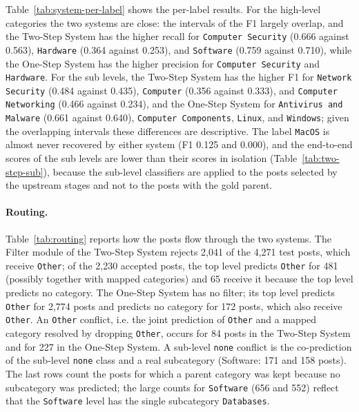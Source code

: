 Table~\ref{tab:system-per-label} shows the per-label results. For the high-level categories the two systems are close: the intervals of the F1 largely overlap, and the Two-Step System has the higher recall for \texttt{Computer Security} (0.666 against 0.563), \texttt{Hardware} (0.364 against 0.253), and \texttt{Software} (0.759 against 0.710), while the One-Step System has the higher precision for \texttt{Computer Security} and \texttt{Hardware}. For the sub levels, the Two-Step System has the higher F1 for \texttt{Network Security} (0.484 against 0.435), \texttt{Computer} (0.356 against 0.333), and \texttt{Computer Networking} (0.466 against 0.234), and the One-Step System for \texttt{Antivirus and Malware} (0.661 against 0.640), \texttt{Computer Components}, \texttt{Linux}, and \texttt{Windows}; given the overlapping intervals these differences are descriptive. The label \texttt{MacOS} is almost never recovered by either system (F1 0.125 and 0.000), and the end-to-end scores of the sub levels are lower than their scores in isolation (Table~\ref{tab:two-step-sub}), because the sub-level classifiers are applied to the posts selected by the upstream stages and not to the posts with the gold parent.

\paragraph{Routing.} Table~\ref{tab:routing} reports how the posts flow through the two systems. The Filter module of the Two-Step System rejects 2,041 of the 4,271 test posts, which receive \texttt{Other}; of the 2,230 accepted posts, the top level predicts \texttt{Other} for 481 (possibly together with mapped categories) and 65 receive it because the top level predicts no category. The One-Step System has no filter; its top level predicts \texttt{Other} for 2,774 posts and predicts no category for 172 posts, which also receive \texttt{Other}. An \texttt{Other} conflict, i.e. the joint prediction of \texttt{Other} and a mapped category resolved by dropping \texttt{Other}, occurs for 84 posts in the Two-Step System and for 227 in the One-Step System. A sub-level \texttt{none} conflict is the co-prediction of the sub-level \texttt{none} class and a real subcategory (Software: 171 and 158 posts). The last rows count the posts for which a parent category was kept because no subcategory was predicted; the large counts for \texttt{Software} (656 and 552) reflect that the \texttt{Software} level has the single subcategory \texttt{Databases}.

